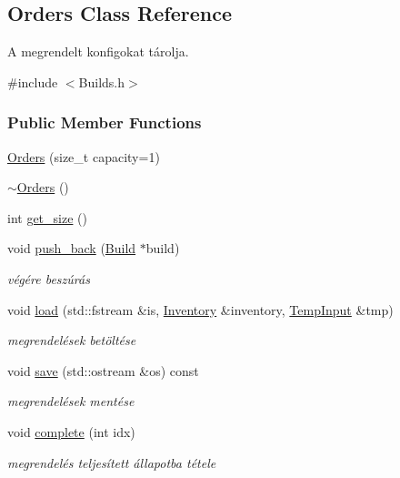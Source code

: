 \hypertarget{class_orders}{}\subsection{Orders Class Reference}
\label{class_orders}


A megrendelt konfigokat tárolja.  




{\ttfamily \#include $<$Builds.\+h$>$}

\subsubsection*{Public Member Functions}
\begin{DoxyCompactItemize}
\item 
\mbox{\hyperlink{class_orders_aa52a641a269671bbf68637e0771e8b5d}{Orders}} (size\+\_\+t capacity=1)
\item 
\mbox{\hyperlink{class_orders_a12bcbd0cd430b51f65f651fddad3f662}{$\sim$\+Orders}} ()
\item 
int \mbox{\hyperlink{class_orders_a9b6a5342d1fe2954f061d91609d3fe89}{get\+\_\+size}} ()
\item 
void \mbox{\hyperlink{class_orders_a6d8d6db032983700fa68cca43dc75a38}{push\+\_\+back}} (\mbox{\hyperlink{class_build}{Build}} $\ast$build)
\begin{DoxyCompactList}\small\item\em végére beszúrás \end{DoxyCompactList}\item 
void \mbox{\hyperlink{class_orders_af0edb320aab3dcae0ee615a5459b5595}{load}} (std\+::fstream \&is, \mbox{\hyperlink{class_inventory}{Inventory}} \&inventory, \mbox{\hyperlink{struct_temp_input}{Temp\+Input}} \&tmp)
\begin{DoxyCompactList}\small\item\em megrendelések betöltése \end{DoxyCompactList}\item 
void \mbox{\hyperlink{class_orders_a80770bd5dffc2d83de0e9acfaad14229}{save}} (std\+::ostream \&os) const
\begin{DoxyCompactList}\small\item\em megrendelések mentése \end{DoxyCompactList}\item 
void \mbox{\hyperlink{class_orders_a6a47de51d6d88328ff6408482f614e8e}{complete}} (int idx)
\begin{DoxyCompactList}\small\item\em megrendelés teljesített állapotba tétele \end{DoxyCompactList}\item 

\end{DoxyCompactItemize}

